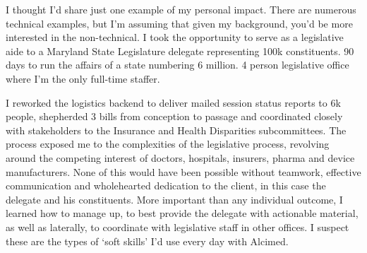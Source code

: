 \documentclass[a4paper]{../res}
\begin{document}
\begin{sloppypar}
\begin{resume}
I thought I'd share just one example of my personal impact. There are numerous technical examples, but I'm assuming that given my background, you'd be more interested in the non-technical. I took the opportunity to serve as a legislative aide to a Maryland State Legislature delegate representing 100k constituents. 90 days to run the affairs of a state numbering 6 million. 4 person legislative office where I'm the only full-time staffer.

I reworked the logistics backend to deliver mailed session status reports to 6k people, shepherded 3 bills from conception to passage and coordinated closely with stakeholders to the Insurance and Health Disparities subcommittees. The process exposed me to the complexities of the legislative process, revolving around the competing interest of doctors, hospitals, insurers, pharma and device manufacturers. None of this would have been possible without teamwork, effective communication and wholehearted dedication to the client, in this case the delegate and his constituents. More important than any individual outcome, I learned how to manage up, to best provide the delegate with actionable material, as well as laterally, to coordinate with legislative staff in other offices. I suspect these are the types of `soft skills' I'd use every day with Alcimed.







\end{resume}
\end{sloppypar}
\end{document}
